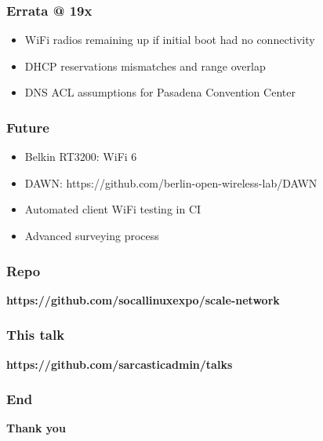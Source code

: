 \documentclass{beamer}
\begin{document}
\begin{frame}
  \frametitle{Errata @ 19x}
  \begin{itemize}
    \item WiFi radios remaining up if initial boot had no connectivity
    \item DHCP reservations mismatches and range overlap
    \item DNS ACL assumptions for Pasadena Convention Center
  \end{itemize}
  \note[item]{}
\end{frame}

\begin{frame}
  \frametitle{Future}
  \begin{itemize}
    \item Belkin RT3200: WiFi 6
    \item DAWN: https://github.com/berlin-open-wireless-lab/DAWN
    \item Automated client WiFi testing in CI
    \item Advanced surveying process
  \end{itemize}
\end{frame}

\begin{frame}
\frametitle{Repo}
  \begin{center}
  {\large \textbf{https://github.com/socallinuxexpo/scale-network}}
  \end{center}
\end{frame}

\begin{frame}
\frametitle{This talk}
  \begin{center}
  {\large \textbf{https://github.com/sarcasticadmin/talks}}
  \end{center}
\end{frame}

\begin{frame}
\frametitle{End}
  \begin{center}
  {\large \textbf{Thank you}}
  \end{center}
\end{frame}
\end{document}
